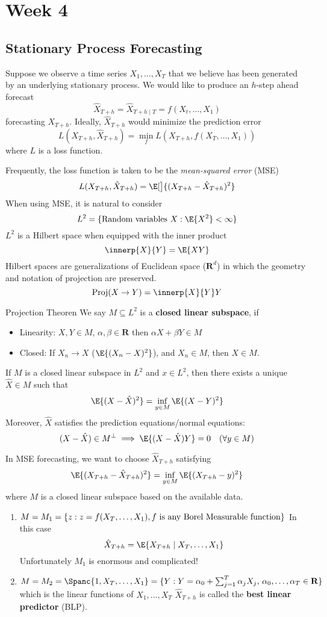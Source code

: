 \chapter{Week 4}
\section{Stationary Process Forecasting}
Suppose we observe a time series
$ X_1,\ldots,X_T $
that we believe has been generated by an underlying
stationary process. We would like to
produce an $ h $-step ahead
forecast
\[ \hat{X}_{T+h}=\hat{X}_{T+h\mid T}=f(X_t,\ldots,X_1) \]
forecasting $ X_{T+h} $. Ideally, $ \hat{X}_{T+h} $
would minimize the prediction error
\[ L(X_{T+h},\hat{X}_{T+h})=\min_f
    L(X_{T+h},f(X_{T},\ldots,X_1)) \]
where $ L $ is a loss function.

Frequently, the loss function is taken
to be the \emph{mean-squared error} (MSE)
\[ L(X_{T+h},\hat{X}_{T+h})=
    \E[\big]{(X_{T+h}-\hat{X}_{T+h})^2} \]
When using MSE, it is natural to consider
\[ L^2=\set{\text{Random variables } X: \E{X^2}<\infty} \]
$ L^2 $ is a Hilbert space when equipped
with the inner product
\[ \innerp{X}{Y}=\E{XY} \]
Hilbert spaces are generalizations of Euclidean space ($ \mathbf{R}^d $)
in which the geometry and notation of projection
are preserved.
\[ \text{Proj}(X\to Y)=\innerp{X}{Y}Y \]
\begin{Theorem}{Projection Theoren}{}
    We say $ M\subseteq L^2 $
    is a \textbf{closed linear subspace}, if
    \begin{itemize}
        \item Linearity: $ X,Y\in M $, $ \alpha,\beta\in\mathbf{R} $
              then $ \alpha X+\beta Y\in M $
        \item Closed: If $ X_n\to X $ ($ \E{(X_n-X)^2} $),
              and $ X_n\in M $, then $ X\in M $.
    \end{itemize}
    If $ M $ is a closed linear subspace in $ L^2 $
    and $ x\in L^2 $, then there exists a
    unique $ \hat{X}\in M $ such that
    \[ \E{(X-\hat{X})^2}=\inf_{y\in M}\E{(X-Y)^2} \]
    Moreover, $ \hat{X} $ satisfies the prediction equations/normal
    equations:
    \[ (X-\hat{X})\in M^\perp \implies \E{(X-\hat{X})Y}=0\quad (\forall y\in M) \]
\end{Theorem}
In MSE forecasting, we want to choose
$ \hat{X}_{T+h} $ satisfying
\[ \E{(X_{T+h}-\hat{X}_{T+h})^2}=\inf_{y\in M}\E{(X_{T+h}-y)^2} \]
where $ M $ is a closed linear subspace based on the available
data.
\begin{enumerate}[(1)]
    \item $ M=M_1=\{z:z=f(X_{T},\ldots,X_{1}), f\text{ is any
                  Borel Measurable function}\} $
          In this case
          \[ \hat{X}_{T+h}=\E{X_{T+h}\mid X_{T},\ldots,X_1} \]
          Unfortunately $ M_1 $ is enormous and complicated!
    \item $ M=M_2=\Spanc{1,X_{T},\ldots,X_1}=
              \set{Y:Y=\alpha_0+\sum_{j=1}^{T} \alpha_j X_j,\,\alpha_0,\ldots,\alpha_T\in\mathbf{R}} $
          which is the linear functions of $ X_1,\ldots,X_T $
          $ \hat{X}_{T+h} $ is called the \textbf{best linear predictor} (BLP).
\end{enumerate}
